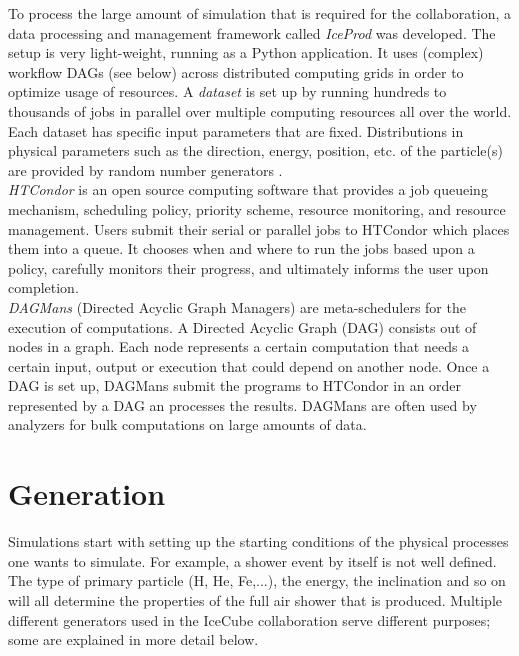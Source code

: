 \noindent To process the large amount of simulation that is required for the collaboration, a data processing and management framework called \textit{IceProd} was developed. The setup is very light-weight, running as a Python application. It uses (complex) workflow DAGs (see below) across distributed computing grids in order to optimize usage of resources. A \textit{dataset} is set up by running hundreds to thousands of jobs in parallel over multiple computing resources all over the world. Each dataset has specific input parameters that are fixed. Distributions in physical parameters such as the direction, energy, position, etc. of the particle(s) are provided by random number generators \cite{1742-6596-664-6-062056}.\\

\noindent \textit{HTCondor} is an open source computing software that provides a job queueing mechanism, scheduling policy, priority scheme, resource monitoring, and resource management. Users submit their serial or parallel jobs to HTCondor which places them into a queue. It chooses when and where to run the jobs based upon a policy, carefully monitors their progress, and ultimately informs the user upon completion.\\

\noindent \textit{DAGMans} (Directed Acyclic Graph Managers) are meta-schedulers for the execution of computations. A Directed Acyclic Graph (DAG) consists out of nodes in a graph. Each node represents a certain computation that needs a certain input, output or execution that could depend on another node. Once a DAG is set up, DAGMans submit the programs to HTCondor in an order represented by a DAG an processes the results. DAGMans are often used by analyzers for bulk computations on large amounts of data.

\section{Generation}
Simulations start with setting up the starting conditions of the physical processes one wants to simulate. For example, a shower event by itself is not well defined. The type of primary particle (H, He, Fe,...), the energy, the inclination and so on will all determine the properties of the full air shower that is produced. Multiple different generators used in the IceCube collaboration serve different purposes; some are explained in more detail below.

